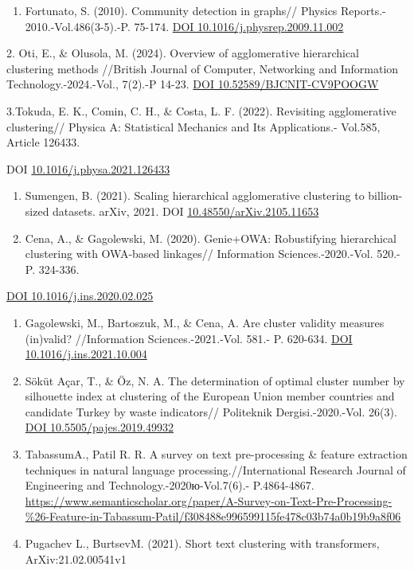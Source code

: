 \begin{references}
\begin{enumerate}
\def\labelenumi{\arabic{enumi}.}
\item
  Fortunato, S. (2010). Community detection in graphs// Physics
  Reports.- 2010.-Vol.486(3-5).-P. 75-174.
  \href{https://doi.org/10.1016/j.physrep.2009.11.002}{DOI
  10.1016/j.physrep.2009.11.002}
\end{enumerate}

2. Oti, E., \& Olusola, M. (2024). Overview of agglomerative
hierarchical clustering methods //British Journal of Computer,
Networking and Information Technology.-2024.-Vol., 7(2).-P 14-23.
\href{https://doi.org/10.52589/BJCNIT-CV9POOGW}{DOI
10.52589/BJCNIT-CV9POOGW}

3.Tokuda, E. K., Comin, C. H., \& Costa, L. F. (2022). Revisiting
agglomerative clustering// Physica A: Statistical Mechanics and Its
Applications.- Vol.585, Article 126433.

DOI
\href{https://doi.org/10.1016/j.physa.2021.126433}{10.1016/j.physa.2021.126433}

\begin{enumerate}
\def\labelenumi{\arabic{enumi}.}
\setcounter{enumi}{1}
\item
  Sumengen, B. (2021). Scaling hierarchical agglomerative clustering to
  billion-sized datasets. arXiv, 2021. DOI
  \href{https://doi.org/10.48550/arXiv.2105.11653}{10.48550/arXiv.2105.11653}
\item
  Cena, A., \& Gagolewski, M. (2020). Genie+OWA: Robustifying
  hierarchical clustering with OWA-based linkages// Information
  Sciences.-2020.-Vol. 520.-P. 324-336.
\end{enumerate}

\href{https://doi.org/10.1016/j.ins.2020.02.025}{DOI
10.1016/j.ins.2020.02.025}

\begin{enumerate}
\def\labelenumi{\arabic{enumi}.}
\setcounter{enumi}{3}
\item
  Gagolewski, M., Bartoszuk, M., \& Cena, A. Are cluster validity
  measures (in)valid? //Information Sciences.-2021.-Vol. 581.- P.
  620-634. \href{https://doi.org/10.1016/j.ins.2021.10.004}{DOI
  10.1016/j.ins.2021.10.004}
\item
  Söküt Açar, T., \& Öz, N. A. The determination of optimal cluster
  number by silhouette index at clustering of the European Union member
  countries and candidate Turkey by waste indicators// Politeknik
  Dergisi.-2020.-Vol. 26(3).
  \href{https://doi.org/10.5505/pajes.2019.49932}{DOI
  10.5505/pajes.2019.49932}
\item
  TabassumA., Patil R. R. A survey on text pre-processing \& feature
  extraction techniques in natural language processing.//International
  Research Journal of Engineering and Technology.-2020ю-Vol.7(6).-
  P.4864-4867.
  \url{https://www.semanticscholar.org/paper/A-Survey-on-Text-Pre-Processing-\%26-Feature-in-Tabassum-Patil/f308488e996599115fe478c03b74a0b19b9a8f06}
\item
  Pugachev L., BurtsevM. (2021). Short text clustering with
  transformers, ArXiv:21.02.00541v1
\end{enumerate}


\end{references}
